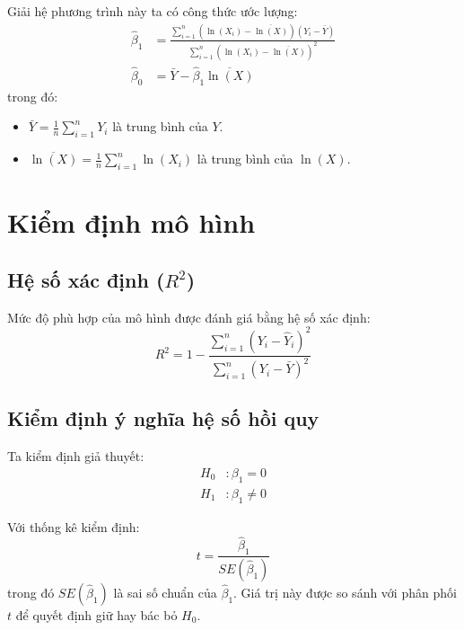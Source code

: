Giải hệ phương trình này ta có công thức ước lượng:
\begin{align}
    \hat{\beta}_1 &= \frac{\sum_{i=1}^{n} \left(\ln(X_i) - \overline{\ln(X)}\right) (Y_i - \bar{Y})}{\sum_{i=1}^{n} \left(\ln(X_i) - \overline{\ln(X)}\right)^2} \\
    \hat{\beta}_0 &= \bar{Y} - \hat{\beta}_1 \overline{\ln(X)}
\end{align}
trong đó:
\begin{itemize}
    \item $\bar{Y} = \frac{1}{n} \sum_{i=1}^{n} Y_i$ là trung bình của $Y$.
    \item $\overline{\ln(X)} = \frac{1}{n} \sum_{i=1}^{n} \ln(X_i)$ là trung bình của $\ln(X)$.
\end{itemize}

\section{Kiểm định mô hình}
\subsection{Hệ số xác định ($R^2$)}
Mức độ phù hợp của mô hình được đánh giá bằng hệ số xác định:
\begin{equation}
    R^2 = 1 - \frac{\sum_{i=1}^{n} (Y_i - \hat{Y}_i)^2}{\sum_{i=1}^{n} (Y_i - \bar{Y})^2}
\end{equation}

\subsection{Kiểm định ý nghĩa hệ số hồi quy}
Ta kiểm định giả thuyết:
\begin{align}
    H_0 &: \beta_1 = 0 \\
    H_1 &: \beta_1 \neq 0
\end{align}

Với thống kê kiểm định:
\begin{equation}
    t = \frac{\hat{\beta}_1}{SE(\hat{\beta}_1)}
\end{equation}
trong đó $SE(\hat{\beta}_1)$ là sai số chuẩn của $\hat{\beta}_1$. Giá trị này được so sánh với phân phối $t$ để quyết định giữ hay bác bỏ $H_0$.
